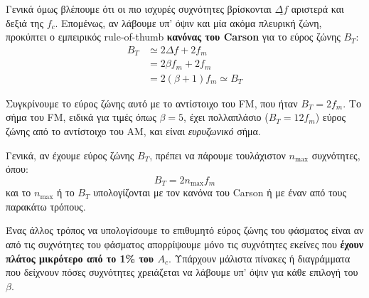 \documentclass[11pt,a4paper,notitlepage,fleqn,final]{article}
\begin{document}

Γενικά όμως βλέπουμε ότι οι πιο ισχυρές συχνότητες βρίσκονται \( \underline{Δf} \) αριστερά
και δεξιά της \( f_c \). Επομένως, αν λάβουμε υπ' όψιν και μία ακόμα πλευρική ζώνη,
προκύπτει ο εμπειρικός
rule-of-thumb \textbf{κανόνας του Carson} για το εύρος ζώνης \( B_{T} \):
\begin{align*}
	B_T &\simeq 2Δf + 2f_m
	\\ &=2βf_m + 2f_m
	\\ &= \boxed{2(β+1)f_m \simeq B_T}
\end{align*}

Συγκρίνουμε το εύρος ζώνης αυτό με το αντίστοιχο του FM, που ήταν \( B_T=2f_m \). Το σήμα
του FM, ειδικά για τιμές όπως \( β = 5 \), έχει πολλαπλάσιο (\( B_T = 12f_m \)) εύρος ζώνης
από το αντίστοιχο του AM, και είναι \textit{ευρυζωνικό} σήμα.

Γενικά, αν έχουμε εύρος ζώνης \( B_T \), πρέπει να πάρουμε τουλάχιστον \( n_{\max} \)
συχνότητες, όπου:
\[
B_T = 2n_{\max}f_m
\]
και το \( n_{\max} \) ή το \( B_T \) υπολογίζονται με τον κανόνα του Carson ή με έναν
από τους παρακάτω τρόπους.

Ένας άλλος τρόπος να υπολογίσουμε το επιθυμητό εύρος ζώνης του φάσματος είναι αν από τις
συχνότητες του φάσματος απορρίψουμε μόνο τις συχνότητες εκείνες που \textbf{έχουν πλάτος 
μικρότερο από το 1\% του \( A_c \)}. Υπάρχουν
μάλιστα πίνακες ή διαγράμματα που δείχνουν πόσες συχνότητες χρειάζεται να λάβουμε υπ' όψιν 
για κάθε επιλογή του \( β \).
\end{document}
